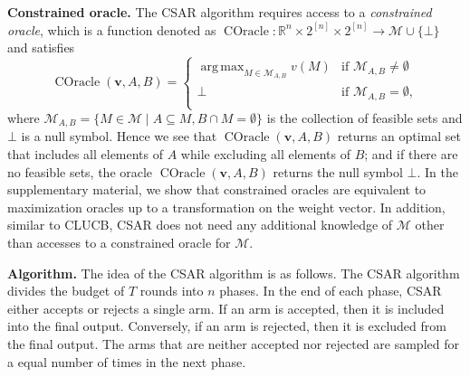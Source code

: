 \documentclass{article}
\newcommand{\junk}[1]{}
\newcommand{\Algorithm}{{\small \textsf{CLUCB}}\xspace}
\newcommand{\AlgorithmBud}{{\small \textsf{CSAR}}\xspace}
\newcommand{\M}{\mathcal M}
\newcommand{\RR}{\mathbb R}
\DeclareMathOperator*{\argmax}{arg\,max}
\DeclareMathOperator{\COracle}{COracle}
\renewcommand{\vec}[1]{\boldsymbol{#1}}
\begin{document}
\textbf{Constrained oracle.} 
The \AlgorithmBud algorithm requires access to a \emph{constrained oracle}, which is a function denoted as $\COracle: \RR^{n}\times 2^{[n]} \times 2^{[n]} \rightarrow \M \cup \{\bot\}$ and satisfies
\begin{equation}
\label{eq:coracle-def}
\COracle(\vec v, A, B)=
\begin{cases} 
	\argmax_{M\in \M_{A,B}} v(M) & \text{if } \M_{A,B} \not= \emptyset\\
	\bot & \text{if }\M_{A,B} = \emptyset,\\
\end{cases}
\end{equation}
where $\M_{A,B}=\{M\in \M \mid A\subseteq M, B\cap M = \emptyset\}$ is the collection of feasible sets and $\bot$ is a null symbol.
Hence we see that $\COracle(\vec v, A, B)$ returns an optimal set that includes all elements of $A$ while excluding all elements of $B$; and if there are no feasible sets, the oracle $\COracle(\vec v, A, B)$ returns the null symbol $\bot$.
In the supplementary material, we show that constrained oracles are equivalent to maximization oracles up to a transformation on the weight vector.
In addition, similar to \Algorithm, \AlgorithmBud does not need any additional knowledge of $\M$ other than accesses to a constrained oracle for $\M$.


\textbf{Algorithm.}
The idea of the \AlgorithmBud algorithm is as follows.
The \AlgorithmBud algorithm divides the budget of $T$ rounds into $n$ phases. 
In the end of each phase, \AlgorithmBud either accepts or rejects a single arm. 
If an arm is accepted, then it is included into the final output. 
Conversely, if an arm is rejected, then it is excluded from the final output.
The arms that are neither accepted nor rejected are sampled for a equal number of times in the next phase.
\junk{We see that the major challenge here is to choose a correct arm to accept/reject. 
For decision classes with non-trivial combinatorial structures, one cannot simply accept/reject arms according to their empirical means, since an arm with small expected reward may belong to the optimal set.
We resolve this challenge by using a novel gap estimation method for decision making and demonstrate that \AlgorithmBud can achieve a small probability of error.}
\end{document}
